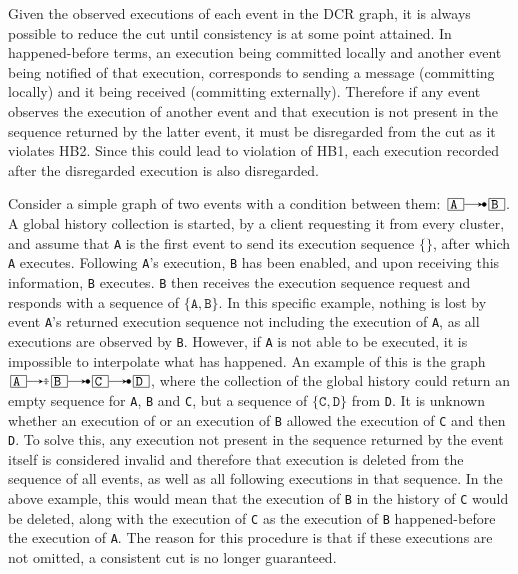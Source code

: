 \documentclass{article}
\begin{document}
	Given the observed executions of each event in the DCR graph, it is always possible to reduce the cut until consistency is at some point attained.
	In happened-before terms, an execution being committed locally and another event being notified of that execution, corresponds to sending a message (committing locally) and it being received (committing externally).
	Therefore if any event observes the execution of another event and that execution is not present in the sequence returned by the latter event, it must be disregarded from the cut as it violates HB2.
	Since this could lead to violation of HB1, each execution recorded after the disregarded execution is also disregarded.

	Consider a simple graph of two events with a condition between them: $\ev{A} \crel \ev{B}$.
	A global history collection is started, by a client requesting it from every cluster, and assume that \texttt{A} is the first event to send its execution sequence $\{\}$, after which \texttt{A} executes.
	Following \texttt{A}'s execution, \texttt{B} has been enabled, and upon receiving this information, \texttt{B} executes.
	\texttt{B} then receives the execution sequence request and responds with a sequence of $\{\texttt{A}, \texttt{B}\}$.
	In this specific example, nothing is lost by event \texttt{A}'s returned execution sequence not including the execution of \texttt{A}, as all executions are observed by \texttt{B}.
	However, if \texttt{A} is not able to be executed, it is impossible to interpolate what has happened.
	An example of this is the graph $\ev{A} \erel \ev{B} \crel \ev{C} \crel \ev{D}$, where the collection of the global history could return an empty sequence for \texttt{A}, \texttt{B} and \texttt{C}, but a sequence of $\{\texttt{C}, \texttt{D}\}$ from \texttt{D}.
	It is unknown whether an execution of  or an execution of \texttt{B} allowed the execution of \texttt{C} and then \texttt{D}.
	To solve this, any execution not present in the sequence returned by the event itself is considered invalid and therefore that execution is deleted from the sequence of all events, as well as all following executions in that sequence.
	In the above example, this would mean that the execution of \texttt{B} in the history of \texttt{C} would be deleted, along with the execution of \texttt{C} as the execution of \texttt{B} happened-before the execution of \texttt{A}.
	The reason for this procedure is that if these executions are not omitted, a consistent cut is no longer guaranteed.
\end{document}
